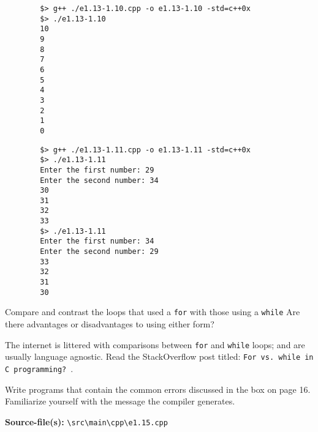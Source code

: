 \documentclass[12pt, a4paper]{article}
\begin{document}
    \begin{verbatim}
        $> g++ ./e1.13-1.10.cpp -o e1.13-1.10 -std=c++0x
        $> ./e1.13-1.10
        10
        9
        8
        7
        6
        5
        4
        3
        2
        1
        0
    \end{verbatim}

    \begin{verbatim}
        $> g++ ./e1.13-1.11.cpp -o e1.13-1.11 -std=c++0x
        $> ./e1.13-1.11
        Enter the first number: 29
        Enter the second number: 34
        30
        31
        32
        33
        $> ./e1.13-1.11
        Enter the first number: 34
        Enter the second number: 29
        33
        32
        31
        30
    \end{verbatim}

    \bigskip
    \begin{tcolorbox}[title={Exercise: 1.14}]
        Compare and contrast the loops that used a \texttt{for} with those using a \texttt{while}
        Are there advantages or disadvantages to using either form?
    \end{tcolorbox}

    \noindent The internet is littered with comparisons between \texttt{for} and \texttt{while} loops; and are usually language agnostic.
    Read the StackOverflow post titled: \texttt{For vs. while in C programming?}~\cite{stackoverflow-for-while}.

    \bigskip
    \begin{tcolorbox}[title={Exercise: 1.15}]
        Write programs that contain the common errors discussed in the box on page 16.
        Familiarize yourself with the message the compiler generates.
    \end{tcolorbox}
    \noindent\textbf{Source-file(s):} \texttt{\textbackslash src\textbackslash main\textbackslash cpp\textbackslash e1.15.cpp}



    \pagebreak
    \printbibliography
\end{document}
